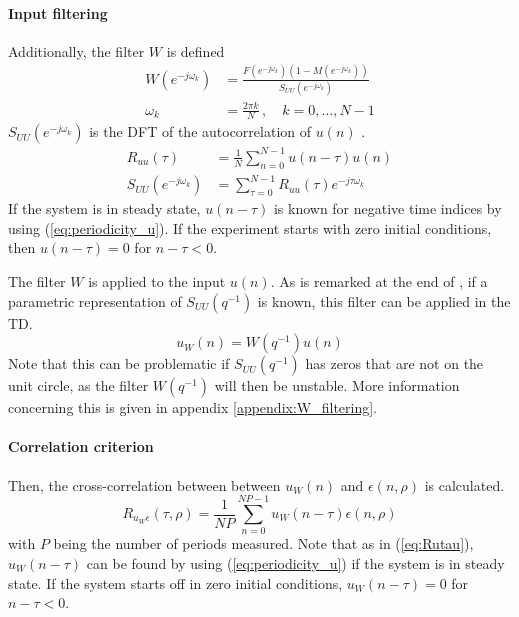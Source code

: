 \paragraph{Input filtering}
Additionally, the filter $W$ is defined \cite[eq. (41)]{Data-driven_model_reference_control}
\begin{align*}
    W(e^{-j\omega_k}) &= \frac{F(e^{-j\omega_k})(1-M(e^{-j\omega_k}))}{S_{UU}(e^{-j \omega_k})} \\
    \omega_k &= \frac{2\pi k}{N} \,,\quad k=0,\ldots,N-1
\end{align*}
$S_{UU}(e^{-j \omega_k})$ is the DFT of the autocorrelation of $u(n)$ \cite[eqs. (38) and (39)]{Data-driven_model_reference_control}.
\begin{align}
    R_{uu}(\tau) &= \frac{1}{N}\sum_{n=0}^{N-1} u(n-\tau) u(n) \label{eq:Rutau}\\
    S_{UU}(e^{-j \omega_k}) &=  \sum_{\tau=0}^{N-1} R_{uu}(\tau) e^{-j \tau \omega_k}\label{eq:Suu}
\end{align}
If the system is in steady state, $u(n-\tau)$ is known for negative time indices by using (\ref{eq:periodicity_u}). If the experiment starts with zero initial conditions, then $u(n-\tau) = 0$ for $n-\tau < 0$.

The filter $W$ is applied to the input $u(n)$. As is remarked at the end of \cite[Sec. 4.4]{Data-driven_model_reference_control}, if a parametric representation of $S_{UU}(q^{-1})$ is known, this filter can be applied in the TD.
\begin{equation*}
    u_W(n) = W(q^{-1}) u(n)
\end{equation*}
Note that this can be problematic if $S_{UU}(q^{-1})$ has zeros that are not on the unit circle, as the filter $W(q^{-1})$ will then be unstable. More information concerning this is given in appendix \ref{appendix:W_filtering}.

\paragraph{Correlation criterion}
Then, the cross-correlation between between $u_W(n)$ and $\epsilon(n,\rho)$ is calculated.
\begin{equation}
    R_{u_W \epsilon}(\tau,\rho) = \frac{1}{N\!P} \sum_{n=0}^{N\!P-1} u_W(n-\tau) \epsilon(n,\rho)
    \label{eq:RuWepstau}
\end{equation}
with $P$ being the number of periods measured. Note that as in (\ref{eq:Rutau}), $u_W(n-\tau)$ can be found by using (\ref{eq:periodicity_u}) if the system is in steady state. If the system starts off in zero initial conditions, $u_W(n-\tau) = 0$ for $n-\tau < 0$.

